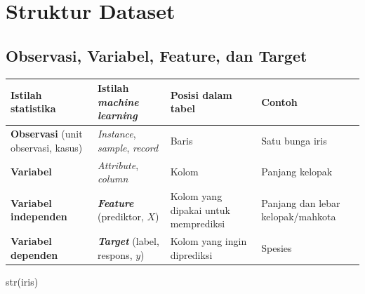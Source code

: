 \documentclass[
  indonesian,
  letterpaper,
]{book}
\newenvironment{Shaded}{\begin{snugshade}}{\end{snugshade}}
\newcommand{\FunctionTok}[1]{\textcolor[rgb]{0.28,0.35,0.67}{#1}}
\newcommand{\NormalTok}[1]{\textcolor[rgb]{0.00,0.23,0.31}{#1}}
\newcounter{none} %
\begin{document}
\section{Struktur Dataset}\label{struktur-dataset}

\subsection{Observasi, Variabel, Feature, dan
Target}\label{observasi-variabel-feature-dan-target}

{\def\LTcaptype{none} %
\begin{longtable}[]{@{}
  >{\raggedright\arraybackslash}p{}
  >{\raggedright\arraybackslash}p{}
  >{\raggedright\arraybackslash}p{}
  >{\raggedright\arraybackslash}p{}@{}}
\toprule\noalign{}
\begin{minipage}[b]{\linewidth}\raggedright
Istilah statistika
\end{minipage} & \begin{minipage}[b]{\linewidth}\raggedright
Istilah \emph{machine learning}
\end{minipage} & \begin{minipage}[b]{\linewidth}\raggedright
Posisi dalam tabel
\end{minipage} & \begin{minipage}[b]{\linewidth}\raggedright
Contoh
\end{minipage} \\
\midrule\noalign{}
\endhead
\bottomrule\noalign{}
\endlastfoot
\textbf{Observasi} (unit observasi, kasus) & \emph{Instance},
\emph{sample}, \emph{record} & Baris & Satu bunga iris \\
\textbf{Variabel} & \emph{Attribute}, \emph{column} & Kolom & Panjang
kelopak \\
\textbf{Variabel independen} & \textbf{\emph{Feature}} (prediktor,
\(X\)) & Kolom yang dipakai untuk memprediksi & Panjang dan lebar
kelopak/mahkota \\
\textbf{Variabel dependen} & \textbf{\emph{Target}} (label, respons,
\(y\)) & Kolom yang ingin diprediksi & Spesies \\
\end{longtable}
}

\begin{Shaded}
\begin{Highlighting}[]
\FunctionTok{str}\NormalTok{(iris)}
\end{Highlighting}
\end{Shaded}
\end{document}
